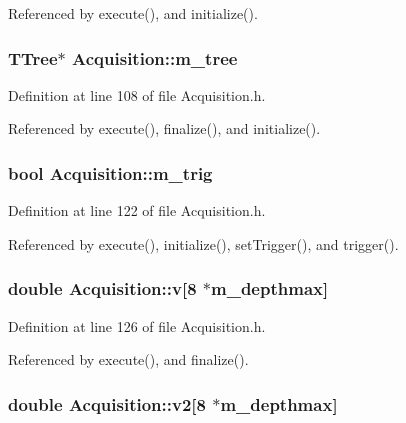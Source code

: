 Referenced by execute(), and initialize().\hypertarget{classAcquisition_a70f10db9c972f22a60bd2b82750168da}{
\subsubsection[{m\_\-tree}]{\setlength{\rightskip}{0pt plus 5cm}TTree$\ast$ {\bf Acquisition::m\_\-tree}}}
\label{classAcquisition_a70f10db9c972f22a60bd2b82750168da}


Definition at line 108 of file Acquisition.h.

Referenced by execute(), finalize(), and initialize().\hypertarget{classAcquisition_a953bdc1bf56206b6df33b648af32a24f}{
\subsubsection[{m\_\-trig}]{\setlength{\rightskip}{0pt plus 5cm}bool {\bf Acquisition::m\_\-trig}}}
\label{classAcquisition_a953bdc1bf56206b6df33b648af32a24f}


Definition at line 122 of file Acquisition.h.

Referenced by execute(), initialize(), setTrigger(), and trigger().\hypertarget{classAcquisition_a8f0ef9898c1e63fb6f13c14508d3180d}{
\subsubsection[{v}]{\setlength{\rightskip}{0pt plus 5cm}double {\bf Acquisition::v}\mbox{[}8 $\ast${\bf m\_\-depthmax}\mbox{]}}}
\label{classAcquisition_a8f0ef9898c1e63fb6f13c14508d3180d}


Definition at line 126 of file Acquisition.h.

Referenced by execute(), and finalize().\hypertarget{classAcquisition_a841316dcf4f210ad52b144b187f2b7b6}{
\subsubsection[{v2}]{\setlength{\rightskip}{0pt plus 5cm}double {\bf Acquisition::v2}\mbox{[}8 $\ast${\bf m\_\-depthmax}\mbox{]}}}
\label{classAcquisition_a841316dcf4f210ad52b144b187f2b7b6}


